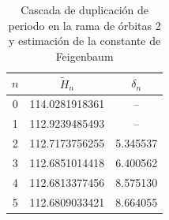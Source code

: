 \begin{table}[h!]
    \centering
    \begin{tabular}{c c c}
        \hline
        $n$ & $\tilde{H}_n$  & $\delta_n$ \\
        \hline
        0   & 114.0281918361 & --         \\
        1   & 112.9239485493 & --         \\
        2   & 112.7173756255 & 5.345537   \\
        3   & 112.6851014418 & 6.400562   \\
        4   & 112.6813377456 & 8.575130   \\
        5   & 112.6809033421 & 8.664055   \\
        \hline
    \end{tabular}
    \caption{Cascada de duplicación de periodo en la rama de órbitas 2 y estimación de la constante de Feigenbaum}
    \label{tab:FlipCascade2}
\end{table}
